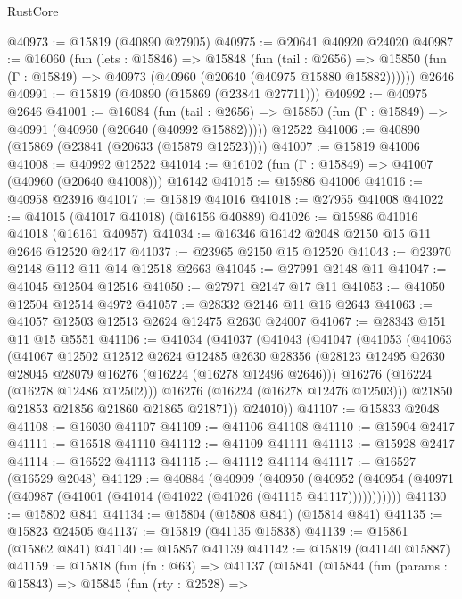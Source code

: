 \begin{lexlean}{RustCore}
\begin{coremodule}
@40973 := @15819 (@40890 @27905)
@40975 := @20641 @40920 @24020
@40987 := @16060
    (fun (lets : @15846) =>
    @15848
      (fun (tail : @2656) =>
      @15850 (fun (Γ : @15849) => @40973 (@40960 (@20640 (@40975 @15880 @15882))))))
    @2646
@40991 := @15819 (@40890 (@15869 (@23841 @27711)))
@40992 := @40975 @2646
@41001 := @16084
    (fun (tail : @2656) => @15850 (fun (Γ : @15849) => @40991 (@40960 (@20640 (@40992 @15882)))))
    @12522
@41006 := @40890 (@15869 (@23841 (@20633 (@15879 @12523))))
@41007 := @15819 @41006
@41008 := @40992 @12522
@41014 := @16102 (fun (Γ : @15849) => @41007 (@40960 (@20640 @41008))) @16142
@41015 := @15986 @41006
@41016 := @40958 @23916
@41017 := @15819 @41016
@41018 := @27955 @41008
@41022 := @41015 (@41017 @41018) (@16156 @40889)
@41026 := @15986 @41016 @41018 (@16161 @40957)
@41034 := @16346 @16142 @2048 @2150 @15 @11 @2646 @12520 @2417
@41037 := @23965 @2150 @15 @12520
@41043 := @23970 @2148 @112 @11 @14 @12518 @2663
@41045 := @27991 @2148 @11
@41047 := @41045 @12504 @12516
@41050 := @27971 @2147 @17 @11
@41053 := @41050 @12504 @12514 @4972
@41057 := @28332 @2146 @11 @16 @2643
@41063 := @41057 @12503 @12513 @2624 @12475 @2630 @24007
@41067 := @28343 @151 @11 @15 @5551
@41106 := @41034
    (@41037
      (@41043
        (@41047
          (@41053
            (@41063
              (@41067
                @12502
                @12512
                @2624
                @12485
                @2630
                @28356
                (@28123 @12495 @2630 @28045 @28079 @16276 (@16224 (@16278 @12496 @2646)))
                @16276
                (@16224 (@16278 @12486 @12502)))
              @16276
              (@16224 (@16278 @12476 @12503)))
            @21850
            @21853
            @21856
            @21860
            @21865
            @21871))
        @24010))
@41107 := @15833 @2048
@41108 := @16030 @41107
@41109 := @41106 @41108
@41110 := @15904 @2417
@41111 := @16518 @41110
@41112 := @41109 @41111
@41113 := @15928 @2417
@41114 := @16522 @41113
@41115 := @41112 @41114
@41117 := @16527 (@16529 @2048)
@41129 := @40884
    (@40909
      (@40950
        (@40952 (@40954 (@40971 (@40987 (@41001 (@41014 (@41022 (@41026 (@41115 @41117)))))))))))
@41130 := @15802 @841
@41134 := @15804 (@15808 @841) (@15814 @841)
@41135 := @15823 @24505
@41137 := @15819 (@41135 @15838)
@41139 := @15861 (@15862 @841)
@41140 := @15857 @41139
@41142 := @15819 (@41140 @15887)
@41159 := @15818
    (fun (fn : @63) =>
    @41137
      (@15841
        (@15844
          (fun (params : @15843) =>
          @15845
            (fun (rty : @2528) =>

\end{coremodule}
\end{lexlean}
